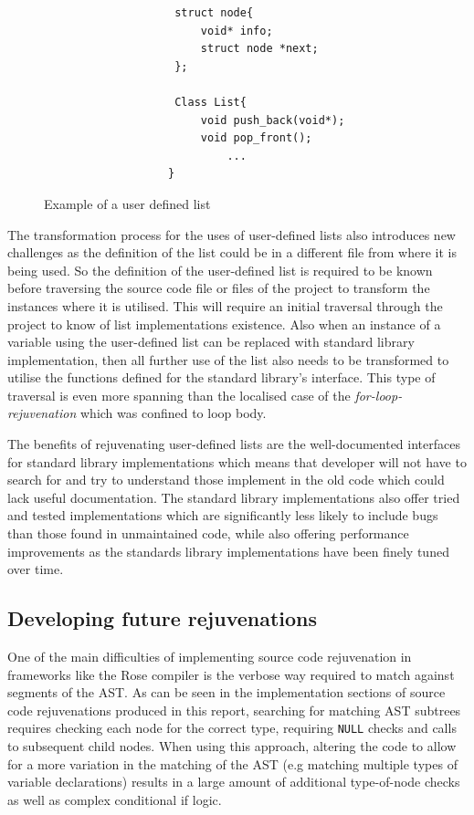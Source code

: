 \documentclass[bsc,frontabs,singlespacing,twoside,parskip,deptreport]{infthesis}
\begin{document}
\begin{figure}[htb]
    \centering
    \begin{verbatim}
                    struct node{
                        void* info;
                        struct node *next;
                    };
                    
                    Class List{
                        void push_back(void*);
                        void pop_front();
                            ...
                   }
    \end{verbatim}
    \caption{Example of a user defined list}
    \label{fig:user-def-list}
\end{figure}

The transformation process for the uses of user-defined lists also introduces new challenges as the definition of the list could be in a different file from where it is being used. So the definition of the user-defined list is required to be known before traversing the source code file or files of the project to transform the instances where it is utilised. This will require an initial traversal through the project to know of list implementations existence. Also when an instance of a variable using the user-defined list can be replaced with standard library implementation, then all further use of the list also needs to be transformed to utilise the functions defined for the standard library's interface. This type of traversal is even more spanning than the localised case of the \textit{for-loop-rejuvenation} which was confined to loop body.

The benefits of rejuvenating user-defined lists are the well-documented interfaces for standard library implementations which means that developer will not have to search for and try to understand those implement in the old code which could lack useful documentation. The standard library implementations also offer tried and tested implementations which are significantly less likely to include bugs than those found in unmaintained code, while also offering performance improvements as the standards library implementations have been finely tuned over time.

\subsection{Developing future rejuvenations}

One of the main difficulties of implementing source code rejuvenation in frameworks like the Rose compiler is the verbose way required to match against segments of the AST. As can be seen in the implementation sections of source code rejuvenations produced in this report, searching for matching AST subtrees requires checking each node for the correct type, requiring \texttt{NULL} checks and calls to subsequent child nodes. When using this approach, altering the code to allow for a more variation in the matching of the AST (e.g matching multiple types of variable declarations) results in a large amount of additional type-of-node checks as well as complex conditional if logic. 
\end{document}
